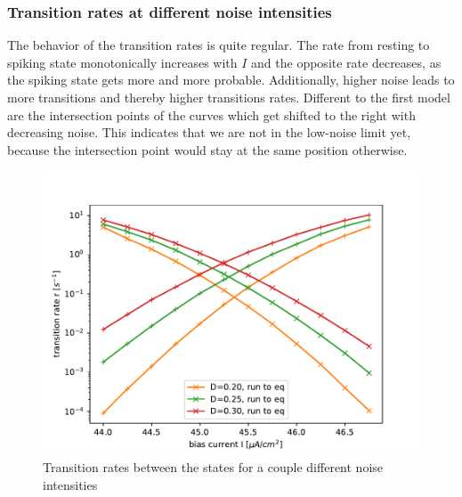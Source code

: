 \documentclass[12pt,a4paper]{article}
\begin{document}
\subsubsection{Transition rates at different noise intensities}
The behavior of the transition rates is quite regular. The rate from resting to spiking state monotonically increases with $I$ and the opposite rate decreases, as the spiking state gets more and more probable. Additionally, higher noise leads to more transitions and thereby higher transitions rates. Different to the first model are the intersection points of the curves which get shifted to the right with decreasing noise. This indicates that we are not in the low-noise limit yet, because the intersection point would stay at the same position otherwise.
\begin{figure}[H]
	\centering
	\includegraphics[scale=1]{tranratesanhopf.pdf}\caption{Transition rates between the states for a couple different noise intensities}
	\label{tranrateanhopf}
\end{figure}
\end{document}
